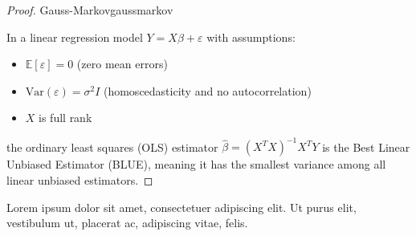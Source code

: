 \begin{proof}{Gauss-Markov}{gaussmarkov}

In a linear regression model $Y = X\beta + \varepsilon$ with assumptions:
\begin{itemize}
    \item $\mathbb{E}[\varepsilon] = 0$ (zero mean errors)
    \item $\text{Var}(\varepsilon) = \sigma^2 I$ (homoscedasticity and no autocorrelation)
    \item $X$ is full rank
\end{itemize}
the ordinary least squares (OLS) estimator $\hat{\beta} = (X^TX)^{-1}X^TY$ 
is the Best Linear Unbiased Estimator (BLUE), meaning it has the smallest 
variance among all linear unbiased estimators.

\end{proof}


\begin{important}
    Lorem ipsum dolor sit amet, consectetuer adipiscing elit. Ut purus elit, vestibulum ut, placerat ac, adipiscing vitae, felis.
\end{important}